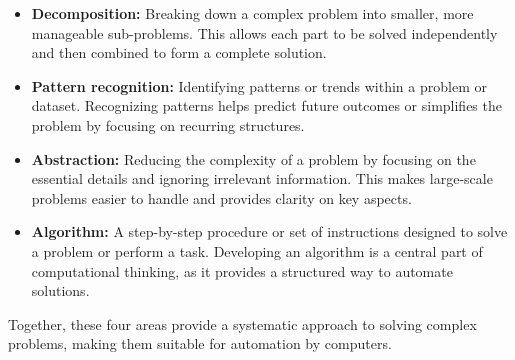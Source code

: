     \begin{itemize}
        \item \textbf{Decomposition:} Breaking down a complex problem into smaller, more manageable sub-problems. This allows each part to be solved independently and then combined to form a complete solution.
        
        \item \textbf{Pattern recognition:} Identifying patterns or trends within a problem or dataset. Recognizing patterns helps predict future outcomes or simplifies the problem by focusing on recurring structures.
        
        \item \textbf{Abstraction:} Reducing the complexity of a problem by focusing on the essential details and ignoring irrelevant information. This makes large-scale problems easier to handle and provides clarity on key aspects.
        
        \item \textbf{Algorithm:} A step-by-step procedure or set of instructions designed to solve a problem or perform a task. Developing an algorithm is a central part of computational thinking, as it provides a structured way to automate solutions.
    \end{itemize}
    
    Together, these four areas provide a systematic approach to solving complex problems, making them suitable for automation by computers.

